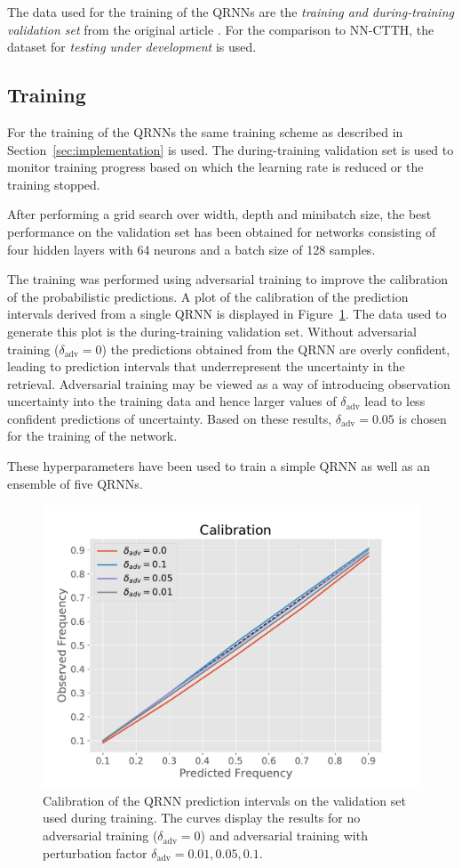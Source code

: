 \documentclass[journal abbreviation, manuscript]{copernicus}
\begin{document}
The data used for the training of the QRNNs are the \textit{training and during-training
validation set} from the original article \citep{hakansson}. For the comparison to
NN-CTTH, the dataset for \textit{testing under development} is used.

\subsection{Training}

For the training of the QRNNs the same training scheme as described in
Section~\ref{sec:implementation} is used. The during-training validation
set is used to monitor training progress based on which the learning rate
is reduced or the training stopped.

After performing a grid search over width, depth and minibatch size, the best
performance on the validation set has been obtained for networks consisting of
four hidden layers with 64 neurons and a batch size of 128 samples.

The training was performed using adversarial training to improve the calibration
of the probabilistic predictions. A plot of the calibration of the prediction
intervals derived from a single QRNN is displayed in
Figure~\ref{fig:validation_calibration}. The data used to generate this plot is
the during-training validation set. Without adversarial training
($\delta_\text{adv} = 0$) the predictions obtained from the QRNN are overly
confident, leading to prediction intervals that underrepresent the uncertainty
in the retrieval. Adversarial training may be viewed as a way of introducing
observation uncertainty into the training data and hence larger values of
$\delta_\text{adv}$ lead to less confident predictions of uncertainty. Based on
these results, $\delta_\text{adv} = 0.05$ is chosen for the training of the
network.

These hyperparameters have been used to train a simple QRNN as well as
an ensemble of five QRNNs.

  \begin{figure}[hbpt!]
    \centering
    \includegraphics[width = 0.4\linewidth]{../plots/validation_calibration}
    \caption{Calibration of the QRNN prediction intervals on the validation set
      used during training. The curves display the results for no adversarial training
      ($\delta_\text{adv} = 0$) and adversarial training with perturbation
      factor $\delta_\text{adv} = 0.01, 0.05, 0.1$.}
    \label{fig:validation_calibration}
  \end{figure}
\end{document}
